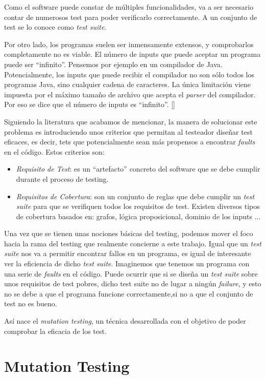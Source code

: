 Como el software puede constar de múltiples funcionalidades, va a ser necesario contar de numerosos test para poder verificarlo correctamente. A un conjunto de test se lo conoce como \textit{test suite}. 

Por otro lado, los programas suelen ser inmensamente extensos, y comprobarlos completamente no es viable. El número de inputs  que puede aceptar un programa puede ser ``infinito''. Pensemos por ejemplo en un compilador de Java. Potencialmente, los inputs que puede recibir el compilador no son sólo todos los programas Java, sino cualquier cadena de caracteres. La única limitación viene impuesta por el máximo tamaño de archivo que acepta el \textit{parser} del compilador. Por eso se dice que el número de inputs es ``infinito''. [\cite{ammann2016introduction}]

Siguiendo la literatura que acabamos de mencionar, la manera de solucionar este problema es introduciendo unos criterios que permitan al testeador diseñar test eficaces, es decir, tets que potencialmente sean más propensos a encontrar \textit{faults} en el código. Estos criterios son:
\begin{itemize}
\item \emph{Requisito de Test}: es un ``artefacto'' concreto del software que se debe cumplir durante el proceso de testing.
\item \emph{Requisitos de Cobertura}: son un conjunto de reglas que debe cumplir un \textit{test suite} para que se verifiquen todos los requisitos de test. Existen diversos tipos de cobertura basados en: grafos, lógica proposicional, dominio de los inputs ...
\end{itemize}

Una vez que se tienen unas nociones básicas del testing, podemos mover el foco hacia la rama del testing que realmente concierne a este trabajo. Igual que un \textit{test suite} nos va a permitir
encontrar fallos en un programa, es igual de interesante ver la eficiencia de dicho \textit{test suite}. Imaginemos que tenemos un programa con una serie de \emph{faults} en el código. Puede ocurrir que si se diseña un \textit{test suite} sobre unos requisitos de test pobres, dicho test suite no de lugar a ningún \emph{failure}, y esto no se debe a que el programa funcione correctamente,si no a que el conjunto de test no es bueno.

Así nace el \textit{mutation testing}, un técnica desarrollada con el objetivo de poder comprobar la eficacia de los test.

\section{Mutation Testing}

